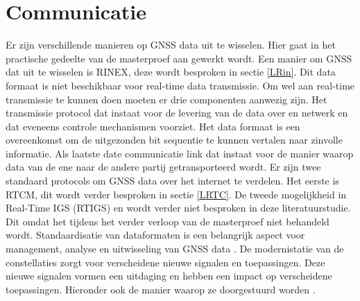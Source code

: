 \section{Communicatie}
\label{LCom}
Er zijn verschillende manieren op GNSS data uit te wisselen. Hier gaat in het practische gedeelte van de masterproef aan gewerkt wordt.  Een manier om GNSS dat uit te wisselen is RINEX, deze wordt besproken in sectie \ref{LRin}. Dit data formaat is niet beschikbaar voor real-time data transmissie. Om wel aan real-time transmissie te kunnen doen moeten er drie componenten aanwezig zijn. Het transmissie protocol dat instaat voor de levering van de data over en netwerk en dat eveneens controle mechanismen voorziet. Het data formaat is een overeenkomst om de uitgezonden bit sequentie te kunnen vertalen naar zinvolle informatie. Als laatste date communicatie link dat instaat voor de manier waarop data van de ene naar de andere partij getransporteerd wordt. Er zijn twee standaard protocols om GNSS data over het internet te verdelen. Het eerste is RTCM, dit wordt verder besproken in sectie \ref{LRTC}. De tweede mogelijkheid in Real-Time IGS (RTIGS) \cite{LBibRTCM} en wordt verder niet besproken in deze literatuurstudie. Dit omdat het tijdens het verder verloop van de masterproef niet behandeld wordt. Standaardisatie van dataformaten is een belangrijk aspect voor management, analyse en uitwisseling van GNSS data \cite{LBibRINEX}. De modernistatie van de constellaties zorgt voor verscheidene nieuwe signalen en toepassingen. Deze nieuwe signalen vormen een uitdaging en hebben een impact op verscheidene toepassingen. Hieronder ook de manier waarop ze doorgestuurd worden \cite{LBibRINEX2}. 


